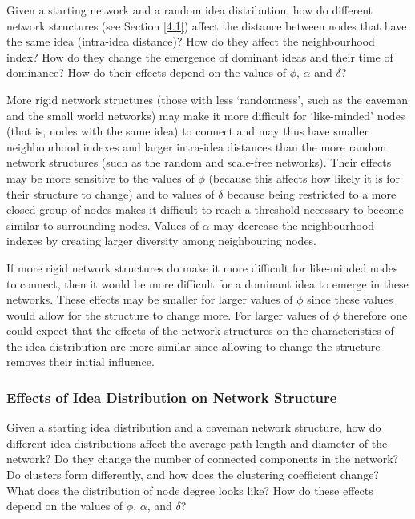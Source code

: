 Given a starting network and a random idea distribution, how do different network structures (see Section \ref{4.1}) affect the distance between nodes that have the same idea (intra-idea distance)? How do they affect the neighbourhood index? How do they change the emergence of dominant ideas and their time of dominance? How do their effects depend on the values of $\phi$, $\alpha$ and $\delta$?


More rigid network structures (those with less `randomness', such as the caveman and the small world networks) may make it more difficult for `like-minded' nodes (that is, nodes with the same idea) to connect and may thus have smaller neighbourhood indexes and larger intra-idea distances than the more random network structures (such as the random and scale-free networks). Their effects may be more sensitive to the values of $\phi$ (because this affects how likely it is for their structure to change) and to values of $\delta$ because being restricted to a more closed group of nodes makes it difficult to reach a threshold necessary to become similar to surrounding nodes. Values of $\alpha$ may decrease the neighbourhood indexes by creating larger diversity among neighbouring nodes.

If more rigid network structures do make it more difficult for like-minded nodes to connect, then it would be more difficult for a dominant idea to emerge in these networks. These effects may be smaller for larger values of $\phi$ since these values would allow for the structure to change more. For larger values of $\phi$ therefore one could expect that the effects of the network structures on the characteristics of the idea distribution are more similar since allowing to change the structure removes their initial influence.


\subsubsection{Effects of Idea Distribution on Network Structure}

Given a starting idea distribution and a caveman network structure, how do different idea distributions affect the average path length and diameter of the network? Do they change the number of connected components in the network? Do clusters form differently, and how does the clustering coefficient change? What does the distribution of node degree looks like? How do these effects depend on the values of $\phi$, $\alpha$, and $\delta$?


